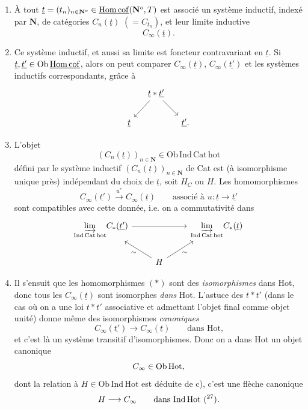\begin{enumerate}
\item[a)] À tout $\underline{t} = (t_n)_{n \in \mathbf{N}^o} \in \underline{\mathrm{Hom\,cof}}(\mathbf{N}^o, T)$ est associé un système inductif, indexé par $\mathbf{N}$, de catégories $C_n(\underline{t})$ $(= C_{t_n})$, et leur limite inductive
\[
C_\infty(\underline{t}).
\]

\item[b)] Ce système inductif, et aussi sa limite est foncteur contravariant en $\underline{t}$. Si $\underline{t}, \underline{t'} \in \mathrm{Ob}\,\underline{\mathrm{Hom\,cof}}$, alors on peut comparer $C_\infty(\underline{t})$, $C_\infty(\underline{t'})$ et les systèmes inductifs correspondants, grâce à
\[
\begin{tikzcd}[column sep=small]
 & \underline{t} * \underline{t'} \arrow[ld] \arrow[rd] & \\
\underline{t} & & \underline{t'}.
\end{tikzcd}
\]

\item[c)] L'objet
\[
(C_n(\underline{t}))_{n \in \mathbf{N}} \in \mathrm{Ob\,Ind\,Cat\,hot}
\]
défini par le système inductif $(C_n(\underline{t}))_{n \in \mathbf{N}}$ de Cat est (à isomorphisme unique près) indépendant du choix de $\underline{t}$, soit $H_C$ ou $H$. Les homomorphismes
\[
C_\infty(\underline{t'}) \xrightarrow{u^*} C_\infty(\underline{t}) \qquad \text{associé à } u : \underline{t} \longrightarrow \underline{t'} \tag*{$(*)$}
\]
sont compatibles avec cette donnée, i.e. on a commutativité dans
\[
\begin{tikzcd}
\underset{\mathrm{Ind\,Cat\,hot}}{\varinjlim} C_*(\underline{t'}) \arrow[rr] & & \underset{\mathrm{Ind\,Cat\,hot}}{\varinjlim} C_*(\underline{t}) \\
 & H \arrow[lu, "\sim"] \arrow[ru, "\sim"'] &
\end{tikzcd}
\]

\item[d)] Il s'ensuit que les homomorphismes $(*)$ sont des \textit{isomorphismes} dans Hot, donc tous les $C_\infty(\underline{t})$ sont isomorphes \textit{dans} Hot. L'astuce des $t * t'$ (dans le cas où on a une loi $t * t'$ associative et admettant l'objet final comme objet unité) donne même des isomorphismes \textit{canoniques}
\[
C_\infty(\underline{t'}) \longrightarrow C_\infty(\underline{t}) \qquad \text{dans Hot,}
\]
et c'est là un système transitif d'isomorphismes. Donc on a dans Hot un objet canonique
\[
C_\infty \in \mathrm{Ob}\,\mathrm{Hot},
\]
dont la relation à $H \in \mathrm{Ob\,Ind\,Hot}$ est déduite de c), c'est une flèche canonique
\[
H \longrightarrow C_\infty \qquad \text{dans Ind\,Hot (\footnotemark[27]).}
\]


\end{enumerate}
